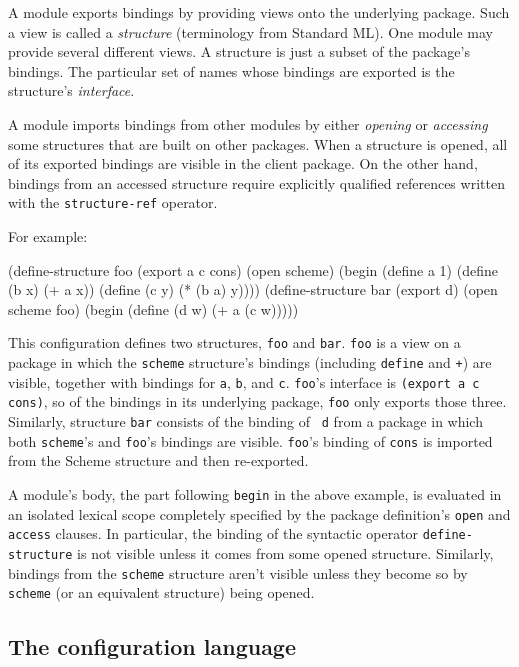 A module exports bindings by providing views onto the underlying
package.  Such a view is called a {\em structure} (terminology from
Standard ML).  One module may provide several different views.  A
structure is just a subset of the package's bindings.  The particular
set of names whose bindings are exported is the structure's {\em
interface}.

A module imports bindings from other modules by either {\em opening}
or {\em accessing} some structures that are built on other packages.
When a structure is opened, all of its exported bindings are visible
in the client package.  On the other hand, bindings from an accessed
structure require explicitly qualified references written with the
{\tt structure-ref} operator.

For example:
\begin{code}
    (define-structure foo (export a c cons)
      (open scheme)
      (begin (define a 1)
             (define (b x) (+ a x))
             (define (c y) (* (b a) y))))
\codeskip
    (define-structure bar (export d)
      (open scheme foo)
      (begin (define (d w) (+ a (c w)))))
\end{code}
This configuration defines two structures, {\tt foo} and {\tt bar}.
{\tt foo} is a view on a package in which the {\tt scheme} structure's
bindings (including {\tt define} and {\tt +}) are visible, together
with bindings for {\tt a}, {\tt b},
and {\tt c}.  {\tt foo}'s interface is {\tt (export a c cons)}, so of
the bindings in its underlying package, {\tt foo} only exports those
three.  Similarly, structure {\tt bar} consists of the binding of {\tt
d} from a package in which both {\tt scheme}'s and {\tt foo}'s
bindings are visible.  {\tt foo}'s binding of {\tt cons} is imported
from the Scheme structure and then re-exported.

A module's body, the part following {\tt begin} in the above example,
is evaluated in an isolated lexical scope completely specified by the
package definition's {\tt open} and {\tt access} clauses.  In
particular, the binding of the syntactic operator {\tt define-structure}
is not visible unless it comes from some opened structure.  Similarly,
bindings from the {\tt scheme} structure aren't visible unless they
become so by {\tt scheme} (or an equivalent structure) being opened.


\subsection*{The configuration language}

